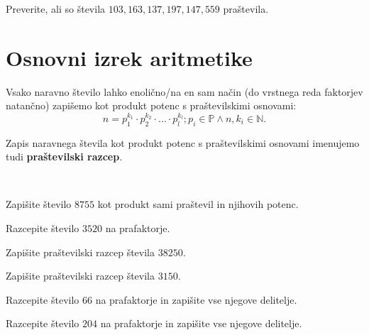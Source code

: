     
            

        \begin{naloga}
            Preverite, ali so števila $103, 163, 137, 197, 147, 559$ praštevila.
        \end{naloga}
            
    
    
    
\section{Osnovni izrek aritmetike}
    
    
        Vsako naravno število lahko enolično/na en sam način (do vrstnega reda faktorjev natančno) zapišemo kot produkt potenc s praštevilskimi osnovami:
        $$ n=p_1^{k_1}\cdot p_2^{k_2}\cdot\ldots\cdot p_l^{k_l};  p_i\in\mathbb{P}\land n, k_i\in\mathbb{N}.$$

    

        Zapis naravnega števila kot produkt potenc s praštevilskimi osnovami imenujemo tudi \textbf{praštevilski razcep}.
                

        ~\\
        \begin{naloga}
            Zapišite število $8755$ kot produkt sami praštevil in njihovih potenc. 
        \end{naloga}

        \begin{naloga}
            Razcepite število $3520$ na prafaktorje. 
        \end{naloga}

        \begin{naloga}
            Zapišite praštevilski razcep števila $38250$. 
        \end{naloga}

        \begin{naloga}
            Zapišite praštevilski razcep števila $3150$. 
        \end{naloga}
    
        \begin{naloga}
            Razcepite število $66$ na prafaktorje in zapišite vse njegove delitelje. 
        \end{naloga}

        \begin{naloga}
            Razcepite število $204$ na prafaktorje in zapišite vse njegove delitelje. 
        \end{naloga}
    
